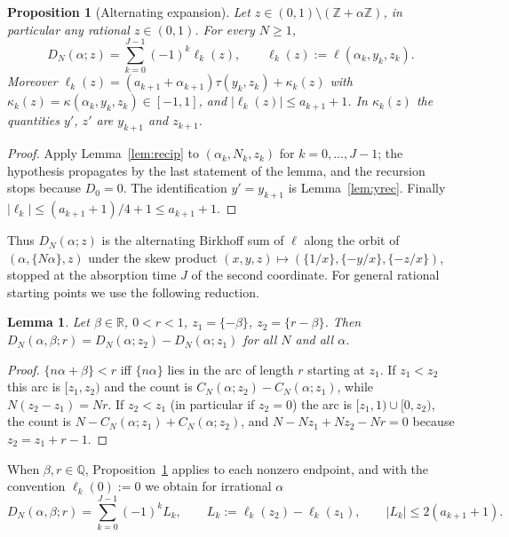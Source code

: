 \documentclass[11pt]{amsart}
\newtheorem{proposition}[theorem]{Proposition}
\newtheorem{lemma}[theorem]{Lemma}
\theoremstyle{definition}
\numberwithin{equation}{section}
\newcommand{\R}{\mathbb{R}}
\newcommand{\Z}{\mathbb{Z}}
\newcommand{\Q}{\mathbb{Q}}
\newcommand{\fr}[1]{\{#1\}}
\begin{document}
\begin{proposition}[Alternating expansion]\label{prop:expansion}
Let $z\in(0,1)\setminus(\Z+\alpha\Z)$, in particular any rational $z\in(0,1)$. For every $N\ge1$,
\begin{equation}\label{eq:expansion}
D_N(\alpha;z)=\sum_{k=0}^{J-1}(-1)^k\ell_k(z),\qquad \ell_k(z):=\ell(\alpha_k,y_k,z_k).
\end{equation}
Moreover $\ell_k(z)=(a_{k+1}+\alpha_{k+1})\tau(y_k,z_k)+\kappa_k(z)$ with $\kappa_k(z)=\kappa(\alpha_k,y_k,z_k)\in[-1,1]$, and $|\ell_k(z)|\le a_{k+1}+1$.
In $\kappa_k(z)$ the quantities $y'$, $z'$ are $y_{k+1}$ and $z_{k+1}$.
\end{proposition}

\begin{proof}
Apply Lemma~\ref{lem:recip} to $(\alpha_k,N_k,z_k)$ for $k=0,\dots,J-1$; the hypothesis propagates by the last statement of the lemma, and the
recursion stops because $D_0=0$. The identification $y'=y_{k+1}$ is Lemma~\ref{lem:yrec}. Finally $|\ell_k|\le(a_{k+1}+1)/4+1\le a_{k+1}+1$.
\end{proof}

Thus $D_N(\alpha;z)$ is the alternating Birkhoff sum of $\ell$ along the orbit of $(\alpha,\fr{N\alpha},z)$ under the skew product
$(x,y,z)\mapsto(\fr{1/x},\fr{-y/x},\fr{-z/x})$, stopped at the absorption time $J$ of the second coordinate. For general rational
starting points we use the following reduction.

\begin{lemma}\label{lem:reduction}
Let $\beta\in\R$, $0<r<1$, $z_1=\fr{-\beta}$, $z_2=\fr{r-\beta}$. Then $D_N(\alpha,\beta;r)=D_N(\alpha;z_2)-D_N(\alpha;z_1)$ for all $N$ and all
$\alpha$.
\end{lemma}

\begin{proof}
$\fr{n\alpha+\beta}<r$ iff $\fr{n\alpha}$ lies in the arc of length $r$ starting at $z_1$. If $z_1<z_2$ this arc is $[z_1,z_2)$ and the count is
$C_N(\alpha;z_2)-C_N(\alpha;z_1)$, while $N(z_2-z_1)=Nr$. If $z_2<z_1$ (in particular if $z_2=0$) the arc is $[z_1,1)\cup[0,z_2)$, the count is
$N-C_N(\alpha;z_1)+C_N(\alpha;z_2)$, and $N-Nz_1+Nz_2-Nr=0$ because $z_2=z_1+r-1$.
\end{proof}

When $\beta,r\in\Q$, Proposition~\ref{prop:expansion} applies to each nonzero endpoint, and with the convention $\ell_k(0):=0$ we obtain for
irrational $\alpha$
\begin{equation}\label{eq:twoexp}
D_N(\alpha,\beta;r)=\sum_{k=0}^{J-1}(-1)^kL_k,\qquad L_k:=\ell_k(z_2)-\ell_k(z_1),\qquad |L_k|\le2(a_{k+1}+1).
\end{equation}
\end{document}
